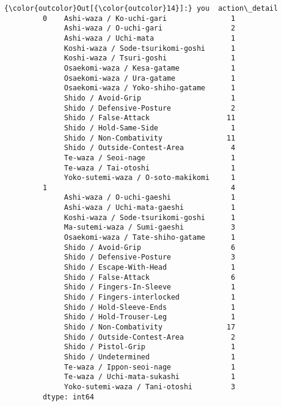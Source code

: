 \documentclass[11pt]{article}
\begin{document}
\begin{Verbatim}[commandchars=\\\{\}]
{\color{outcolor}Out[{\color{outcolor}14}]:} you  action\_detail                     
         0    Ashi-waza / Ko-uchi-gari               1
              Ashi-waza / O-uchi-gari                2
              Ashi-waza / Uchi-mata                  1
              Koshi-waza / Sode-tsurikomi-goshi      1
              Koshi-waza / Tsuri-goshi               1
              Osaekomi-waza / Kesa-gatame            1
              Osaekomi-waza / Ura-gatame             1
              Osaekomi-waza / Yoko-shiho-gatame      1
              Shido / Avoid-Grip                     1
              Shido / Defensive-Posture              2
              Shido / False-Attack                  11
              Shido / Hold-Same-Side                 1
              Shido / Non-Combativity               11
              Shido / Outside-Contest-Area           4
              Te-waza / Seoi-nage                    1
              Te-waza / Tai-otoshi                   1
              Yoko-sutemi-waza / O-soto-makikomi     1
         1                                           4
              Ashi-waza / O-uchi-gaeshi              1
              Ashi-waza / Uchi-mata-gaeshi           1
              Koshi-waza / Sode-tsurikomi-goshi      1
              Ma-sutemi-waza / Sumi-gaeshi           3
              Osaekomi-waza / Tate-shiho-gatame      1
              Shido / Avoid-Grip                     6
              Shido / Defensive-Posture              3
              Shido / Escape-With-Head               1
              Shido / False-Attack                   6
              Shido / Fingers-In-Sleeve              1
              Shido / Fingers-interlocked            1
              Shido / Hold-Sleeve-Ends               1
              Shido / Hold-Trouser-Leg               1
              Shido / Non-Combativity               17
              Shido / Outside-Contest-Area           2
              Shido / Pistol-Grip                    1
              Shido / Undetermined                   1
              Te-waza / Ippon-seoi-nage              1
              Te-waza / Uchi-mata-sukashi            1
              Yoko-sutemi-waza / Tani-otoshi         3
         dtype: int64
\end{Verbatim}
            

    
    
    
    
\end{document}
